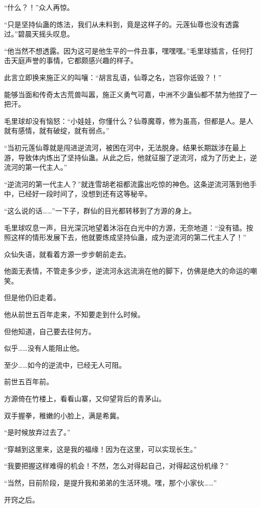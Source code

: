 \begin{this_body}
“什么？！”众人再惊。

“只是坚持仙蛊的炼法，我们从未料到，竟是这样子的。元莲仙尊也没有透露过。”碧晨天摇头叹息。

“他当然不想透露。因为这可是他生平的一件丑事，嘿嘿嘿。”毛里球插言，任何打击天庭声誉的事情，它都颇感兴趣的样子。

此言立即换来施正义的叫嚷：“胡言乱语，仙尊之名，岂容你诋毁？！”

能够当面和传奇太古荒兽叫嚣，施正义勇气可嘉，中洲不少蛊仙都不禁为他捏了一把汗。

毛里球却没有恼怒：“小娃娃，你懂什么？仙尊魔尊，修为虽高，但都是人。是人就有感情，就有破绽，就有弱点。”

“当初元莲仙尊就是闯进逆流河，被困在河中，无法脱身。结果长期跋涉在最上游，导致体内炼出了坚持仙蛊。从此之后，他就征服了逆流河，成为了历史上，逆流河的第一代主人。”

“逆流河的第一代主人？”就连雪胡老祖都流露出吃惊的神色。这条逆流河落到他手中，已经好一段时间了，没想到还有这等秘辛。

“这么说的话……”一下子，群仙的目光都转移到了方源的身上。

毛里球叹息一声，目光深沉地望着沐浴在白光中的方源，无奈地道：“没有错。按照这样的情形发展下去，他就要炼成坚持仙蛊，成为逆流河的第二代主人了！”

众仙失语，就看着方源一步步朝前走去。

他面无表情，不管走多少步，逆流河永远流淌在他的脚下，仿佛是绝大的命运的嘲笑。

但是他仍旧走着。

他从前世五百年走来，不知要走到什么时候。

但他知道，自己要去往何方。

似乎……没有人能阻止他。

至少……如今的逆流中，已经无人可阻。

前世五百年前。

方源倚在竹楼上，看看山寨，又仰望背后的青茅山。

双手握拳，稚嫩的小脸上，满是希冀。

“是时候放弃过去了。”

“穿越到这里来，这是我的福缘！因为在这里，可以实现长生。”

“我要把握这样难得的机会！不然，怎么对得起自己，对得起这份机缘？”

“当然，目前阶段，是提升我和弟弟的生活环境。嘿，那个小家伙……”

开窍之后。


\end{this_body}
